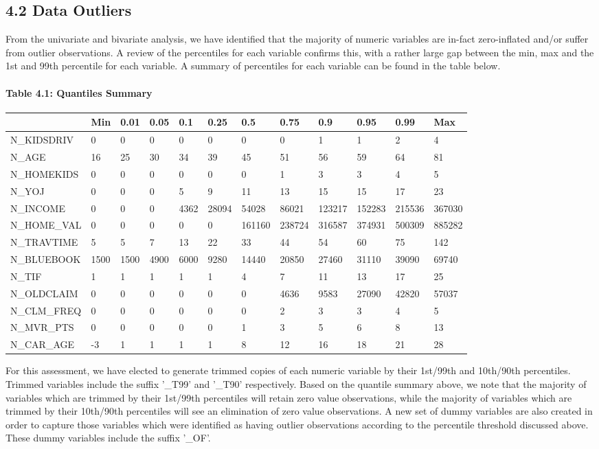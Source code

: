 \documentclass[]{article}
\let\oldparagraph\paragraph
\renewcommand{\paragraph}[1]{\oldparagraph{#1}\mbox{}}
\begin{document}
\subsection{4.2 Data Outliers}\label{data-outliers}

From the univariate and bivariate analysis, we have identified that the
majority of numeric variables are in-fact zero-inflated and/or suffer
from outlier observations. A review of the percentiles for each variable
confirms this, with a rather large gap between the min, max and the 1st
and 99th percentile for each variable. A summary of percentiles for each
variable can be found in the table below.

\newpage

\paragraph{Table 4.1: Quantiles
Summary}\label{table-4.1-quantiles-summary}

\begin{longtable}[]{@{}llllllllllll@{}}
\toprule
& Min & 0.01 & 0.05 & 0.1 & 0.25 & 0.5 & 0.75 & 0.9 & 0.95 & 0.99 &
Max\tabularnewline
\midrule
\endhead
N\_KIDSDRIV & 0 & 0 & 0 & 0 & 0 & 0 & 0 & 1 & 1 & 2 & 4\tabularnewline
N\_AGE & 16 & 25 & 30 & 34 & 39 & 45 & 51 & 56 & 59 & 64 &
81\tabularnewline
N\_HOMEKIDS & 0 & 0 & 0 & 0 & 0 & 0 & 1 & 3 & 3 & 4 & 5\tabularnewline
N\_YOJ & 0 & 0 & 0 & 5 & 9 & 11 & 13 & 15 & 15 & 17 & 23\tabularnewline
N\_INCOME & 0 & 0 & 0 & 4362 & 28094 & 54028 & 86021 & 123217 & 152283 &
215536 & 367030\tabularnewline
N\_HOME\_VAL & 0 & 0 & 0 & 0 & 0 & 161160 & 238724 & 316587 & 374931 &
500309 & 885282\tabularnewline
N\_TRAVTIME & 5 & 5 & 7 & 13 & 22 & 33 & 44 & 54 & 60 & 75 &
142\tabularnewline
N\_BLUEBOOK & 1500 & 1500 & 4900 & 6000 & 9280 & 14440 & 20850 & 27460 &
31110 & 39090 & 69740\tabularnewline
N\_TIF & 1 & 1 & 1 & 1 & 1 & 4 & 7 & 11 & 13 & 17 & 25\tabularnewline
N\_OLDCLAIM & 0 & 0 & 0 & 0 & 0 & 0 & 4636 & 9583 & 27090 & 42820 &
57037\tabularnewline
N\_CLM\_FREQ & 0 & 0 & 0 & 0 & 0 & 0 & 2 & 3 & 3 & 4 & 5\tabularnewline
N\_MVR\_PTS & 0 & 0 & 0 & 0 & 0 & 1 & 3 & 5 & 6 & 8 & 13\tabularnewline
N\_CAR\_AGE & -3 & 1 & 1 & 1 & 1 & 8 & 12 & 16 & 18 & 21 &
28\tabularnewline
\bottomrule
\end{longtable}

For this assessment, we have elected to generate trimmed copies of each
numeric variable by their 1st/99th and 10th/90th percentiles. Trimmed
variables include the suffix '\_T99' and '\_T90' respectively. Based on
the quantile summary above, we note that the majority of variables which
are trimmed by their 1st/99th percentiles will retain zero value
observations, while the majority of variables which are trimmed by their
10th/90th percentiles will see an elimination of zero value
observations. A new set of dummy variables are also created in order to
capture those variables which were identified as having outlier
observations according to the percentile threshold discussed above.
These dummy variables include the suffix '\_OF'.
\end{document}
